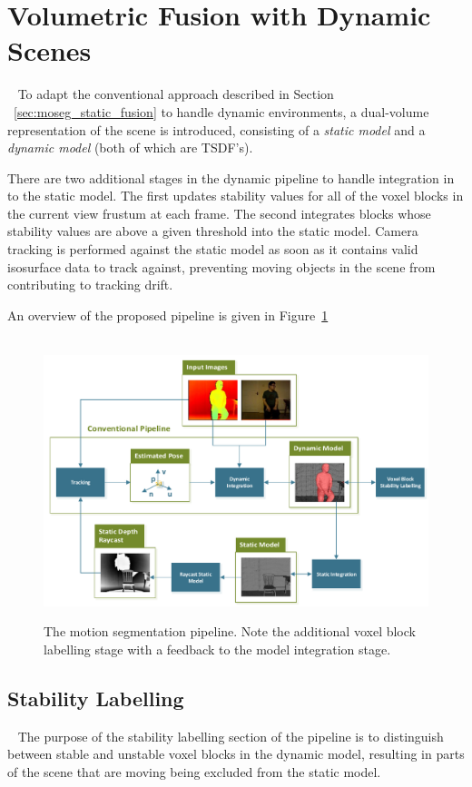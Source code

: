 \section{Volumetric Fusion with Dynamic Scenes}
~\label{sec:moseg_dynamic_fusion}
To adapt the conventional approach described in Section
~\ref{sec:moseg_static_fusion} to handle dynamic environments, a dual-volume
representation of the scene is introduced, consisting of a \emph{static model}
and a \emph{dynamic model} (both of which are TSDF's).

There are two additional stages in the dynamic pipeline to handle integration in
to the static model. The first updates stability values for all of the voxel
blocks in the current view frustum at each frame. The second integrates blocks
whose stability values are above a given threshold into the static model.
Camera tracking is performed against the static model as soon as it contains
valid isosurface data to track against, preventing moving objects in the scene
from contributing to tracking drift.

An overview of the proposed pipeline is given in Figure~\ref{fig:moseg_pipeline}
\begin{figure}[!htbp]
~\label{fig:moseg_pipeline}
  \centering
  \includegraphics[width=0.95\linewidth]{figures/moseg/pipeline.pdf}
  \caption[Motion Segmentation Pipeline]{The motion segmentation pipeline. 
  Note the additional voxel block labelling stage with a feedback to the model 
  integration stage.}
\end{figure}

\subsection{Stability Labelling}
~\label{sub:moseg_stability_labelling}
The purpose of the stability labelling section of the pipeline is to distinguish
between stable and unstable voxel blocks in the dynamic model, resulting in
parts of the scene that are moving being excluded from the static model.

